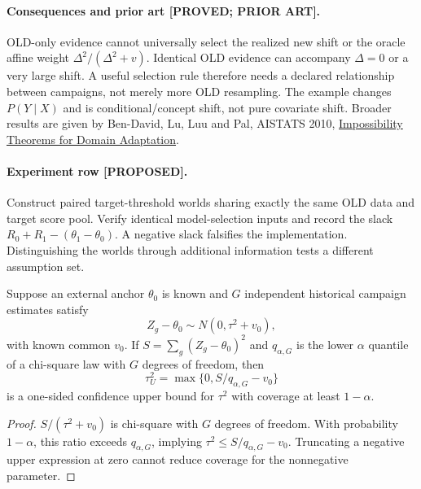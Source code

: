 \paragraph{Consequences and prior art [PROVED; PRIOR ART].}
OLD-only evidence cannot universally select the realized new shift or
the oracle affine weight $\Delta^2/(\Delta^2+v)$.  Identical OLD evidence
can accompany $\Delta=0$ or a very large shift.  A useful selection rule
therefore needs a declared relationship between campaigns, not merely
more OLD resampling.  The example changes $P(Y\mid X)$ and is
conditional/concept shift, not pure covariate shift.  Broader results are
given by Ben-David, Lu, Luu and Pal, AISTATS 2010,
\href{https://proceedings.mlr.press/v9/david10a.html}{Impossibility Theorems for Domain Adaptation}.

\paragraph{Experiment row [PROPOSED].}
Construct paired target-threshold worlds sharing exactly the same OLD
data and target score pool.  Verify identical model-selection inputs
and record the slack $R_0+R_1-(\theta_1-\theta_0)$.  A negative slack
falsifies the implementation.  Distinguishing the worlds through
additional information tests a different assumption set.

\begin{proposition}
Suppose an external anchor $\theta_0$ is known and $G$ independent
historical campaign estimates satisfy
\[
 Z_g-\theta_0\sim N(0,\tau^2+v_0),
\]
with known common $v_0$.  If $S=\sum_g(Z_g-\theta_0)^2$ and
$q_{\alpha,G}$ is the lower $\alpha$ quantile of a chi-square law with
$G$ degrees of freedom, then
\[
 \tau_U^2=\max\{0,S/q_{\alpha,G}-v_0\}
\]
is a one-sided confidence upper bound for $\tau^2$ with coverage at
least $1-\alpha$.
\end{proposition}
\begin{proof}
$S/(\tau^2+v_0)$ is chi-square with $G$ degrees of freedom.  With
probability $1-\alpha$, this ratio exceeds $q_{\alpha,G}$, implying
$\tau^2\leq S/q_{\alpha,G}-v_0$.  Truncating a negative upper expression
at zero cannot reduce coverage for the nonnegative parameter.
\end{proof}

